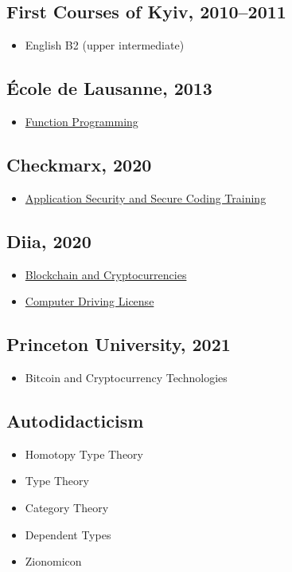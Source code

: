 \subsection*{First Courses of Kyiv, 2010–2011}
\begin{itemize}
  \item English B2 (upper intermediate)
\end{itemize}

\subsection*{École de Lausanne, 2013}
\begin{itemize}
  \item \href{https://tellnobody.space/cv/cert/fp.pdf}{Function Programming}
\end{itemize}

\subsection*{Checkmarx, 2020}
\begin{itemize}
  \item \href{https://tellnobody.space/cv/cert/sec.pdf}{Application Security and Secure Coding Training}
\end{itemize}

\subsection*{Diia, 2020}
\begin{itemize}
  \item \href{https://tellnobody.space/cv/cert/crypto.pdf}{Blockchain and Cryptocurrencies}
  \item \href{https://tellnobody.space/cv/cert/cdl.pdf}{Computer Driving License}
\end{itemize}

\subsection*{Princeton University, 2021}
\begin{itemize}
  \item Bitcoin and Cryptocurrency Technologies
\end{itemize}

\subsection*{Autodidacticism}
\begin{itemize}
  \item Homotopy Type Theory
  \item Type Theory
  \item Category Theory
  \item Dependent Types
  \item Zionomicon
\end{itemize}

